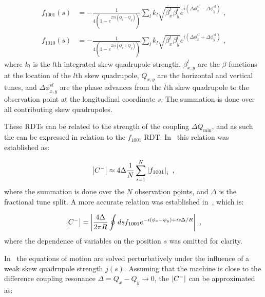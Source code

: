 \begin{equation}
    \begin{aligned}
        f_{1001}(s) &= - \frac{1}{4 \left(1 - e^{2 \pi i \left(Q_x - Q_y \right)}\right)} \sum_l k_l \sqrt{\beta_x^l \beta_y^l} e^{i \left(\Delta \phi_x^{s l} - \Delta \phi_y^{s l}\right)} \text{ ,} \\
        f_{1010}(s) &= - \frac{1}{4 \left(1 - e^{2 \pi i \left(Q_x + Q_y \right)}\right)} \sum_l k_l \sqrt{\beta_x^l \beta_y^l} e^{i \left(\Delta \phi_x^{s l} + \Delta \phi_y^{s l}\right)} \text{ ,}
    \end{aligned}
    \label{equation:coupling_rdts_from_skew_quads}
\end{equation}
where \(k_l\) is the \(l\)th integrated \gls{skew} quadrupole strength, \(\beta_{x,y}^{l}\) are the \(\beta\)-functions at the location of the \(l\)th skew quadrupole, \(Q_{x,y}\) are the horizontal and vertical tunes, and \(\Delta \phi_{x,y}^{s l}\) are the phase advances from the \(l\)th skew quadrupole to the observation point at the longitudinal coordinate \(s\).
The summation is done over all contributing \gls{skew} quadrupoles.

These \glspl{RDT} can be related to the strength of the coupling \(\Delta Q_{\mathrm{min}}\), and as such the  can be expressed in relation to the \(f_{1001}\) \gls{RDT}.
In~\cite{PHD:Franchi} this relation was established as:

\begin{equation}
    \left\lvert C^{-} \right\rvert \approx 4 \Delta \frac{1}{N} \sum_{i=1}^N \left\lvert f_{1001} \right\rvert_i \text{ ,}
    \label{equation:deltaqmin_from_f1001_franchi}
\end{equation}
where the summation is done over the \(N\) observation points, and \(\Delta\) is the fractional tune split.
A more accurate relation was established in~\cite{PRAB:Persson:Improved_Control_Betatron_Coupling}, which is:

\begin{equation}
    \left\lvert C^{-} \right\rvert = \left\lvert \frac{4 \Delta}{2 \pi R} \oint d s f_{1001} e^{-i \left(\phi_x - \phi_y \right) + i s \Delta / R}  \right\rvert \text{ ,}
    \label{equation:deltaqmin_from_f1001}
\end{equation}
where the dependence of variables on the position \(s\) was omitted for clarity.

In~\cite{PHREV:Guignard:Betatron_Coupling_Radiation} the equations of motion are solved perturbatively under the influence of a weak \gls{skew} quadrupole strength \(j(s)\).
Assuming that the machine is close to the difference coupling resonance \(\Delta = Q_x - Q_y \rightarrow 0\), the \(\left\lvert C^{-} \right\rvert\) can be approximated as:

